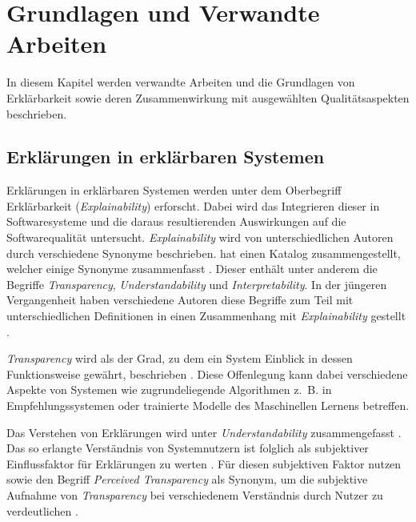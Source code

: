 \chapter{Grundlagen und Verwandte Arbeiten}

In diesem Kapitel werden verwandte Arbeiten und die Grundlagen von Erklärbarkeit sowie deren Zusammenwirkung mit ausgewählten Qualitätsaspekten beschrieben.

\section{Erklärungen in erklärbaren Systemen}
\label{02_basics:explainable_system}

Erklärungen in erklärbaren Systemen werden unter dem Oberbegriff Erklärbarkeit (\textit{Explainability}) erforscht. Dabei wird das Integrieren dieser in Softwaresysteme und die daraus resultierenden Auswirkungen auf die Softwarequalität untersucht. \textit{Explainability} wird von unterschiedlichen Autoren durch verschiedene Synonyme beschrieben. \citeauthor{brennen_what_2020} hat einen Katalog zusammengestellt, welcher einige Synonyme zusammenfasst \cite{brennen_what_2020}. Dieser enthält unter anderem die Begriffe
\textit{Transparency}, \textit{Understandability} und \textit{Interpretability}. In der jüngeren Vergangenheit haben verschiedene Autoren diese Begriffe zum Teil mit unterschiedlichen Definitionen in einen Zusammenhang mit \textit{Explainability} gestellt \cite{chazette_end-users_nodate,chazette_knowledge_nodate,kohl_explainability_2019,wang_integration_2020}.

\textit{Transparency} wird als der Grad, zu dem ein System Einblick in dessen Funktionsweise gewährt, beschrieben \cite{chazette_end-users_nodate}. Diese Offenlegung kann dabei verschiedene Aspekte von Systemen wie zugrundeliegende Algorithmen z.~B. in Empfehlungssystemen \cite{balog_measuring_2020} oder trainierte Modelle des Maschinellen Lernens \cite{sovrano_modelling_2020} betreffen.

Das Verstehen von Erklärungen wird unter \textit{Understandability} zusammengefasst \cite{do2010software}. Das so erlangte Verständnis von Systemnutzern ist folglich als subjektiver Einflussfaktor für Erklärungen zu werten \cite{chazette_end-users_nodate}. Für diesen subjektiven Faktor nutzen \citeauthor{wang_integration_2020} sowie \citeauthor{balog_measuring_2020} den Begriff \textit{Perceived Transparency} als Synonym, um die subjektive Aufnahme von \textit{Transparency} bei verschiedenem Verständnis durch Nutzer zu verdeutlichen \cite{wang_integration_2020, balog_measuring_2020}.

